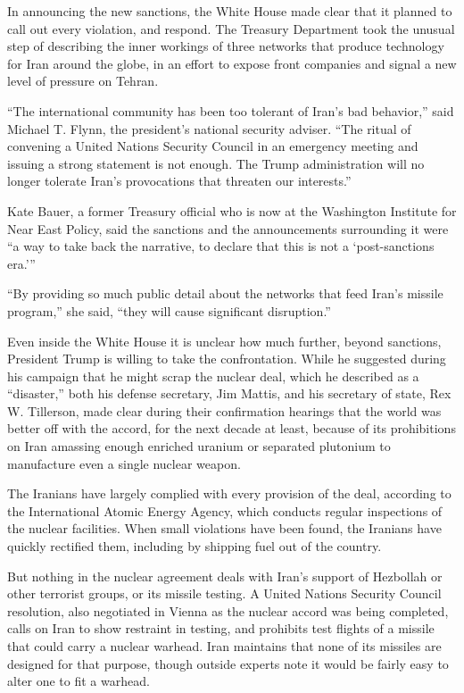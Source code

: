 In announcing the new sanctions, the White House made clear that it
planned to call out every violation, and respond. The Treasury
Department took the unusual step of describing the inner workings of
three networks that produce technology for Iran around the globe, in an
effort to expose front companies and signal a new level of pressure on
Tehran.

``The international community has been too tolerant of Iran's bad
behavior,'' said Michael T. Flynn, the president's national security
adviser. ``The ritual of convening a United Nations Security Council in
an emergency meeting and issuing a strong statement is not enough. The
Trump administration will no longer tolerate Iran's provocations that
threaten our interests.''

Kate Bauer, a former Treasury official who is now at the Washington
Institute for Near East Policy, said the sanctions and the announcements
surrounding it were ``a way to take back the narrative, to declare that
this is not a `post-sanctions era.'''

``By providing so much public detail about the networks that feed Iran's
missile program,'' she said, ``they will cause significant disruption.''

Even inside the White House it is unclear how much further, beyond
sanctions, President Trump is willing to take the confrontation. While
he suggested during his campaign that he might scrap the nuclear deal,
which he described as a ``disaster,'' both his defense secretary, Jim
Mattis, and his secretary of state, Rex W. Tillerson, made clear during
their confirmation hearings that the world was better off with the
accord, for the next decade at least, because of its prohibitions on
Iran amassing enough enriched uranium or separated plutonium to
manufacture even a single nuclear weapon.

The Iranians have largely complied with every provision of the deal,
according to the International Atomic Energy Agency, which conducts
regular inspections of the nuclear facilities. When small violations
have been found, the Iranians have quickly rectified them, including by
shipping fuel out of the country.

But nothing in the nuclear agreement deals with Iran's support of
Hezbollah or other terrorist groups, or its missile testing. A United
Nations Security Council resolution, also negotiated in Vienna as the
nuclear accord was being completed, calls on Iran to show restraint in
testing, and prohibits test flights of a missile that could carry a
nuclear warhead. Iran maintains that none of its missiles are designed
for that purpose, though outside experts note it would be fairly easy to
alter one to fit a warhead.


